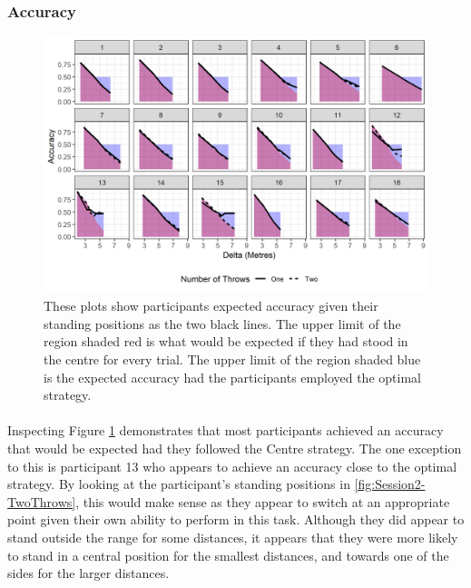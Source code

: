 \documentclass[12pt]{article}
\begin{document}
\subsubsection*{Accuracy}

\begin{figure}[ht!]%
	\includegraphics[scale=0.9]{Figures/Experiment_2_Two_throw/Accuracyshaded_regions}
	\centering
	\captionsetup{justification=centering}
	\caption{These plots show participants expected accuracy given their standing positions as the two black lines. The upper limit of the region shaded red is what would be expected if they had stood in the centre for every trial. The upper limit of the region shaded blue is the expected accuracy had the participants employed the optimal strategy.}
	\label{fig:Session2-TwoThrows-Accuracy}
\end{figure}

\paragraph{} Inspecting Figure \ref{fig:Session2-TwoThrows-Accuracy} demonstrates that most participants achieved an accuracy that would be expected had they followed the Centre strategy. The one exception to this is participant 13 who appears to achieve an accuracy close to the optimal strategy. By looking at the participant's standing positions in \ref{fig:Session2-TwoThrows}, this would make sense as they appear to switch at an appropriate point given their own ability to perform in this task. Although they did appear to stand outside the range for some distances, it appears that they were more likely to stand in a central position for the smallest distances, and towards one of the sides for the larger distances. 
\end{document}
